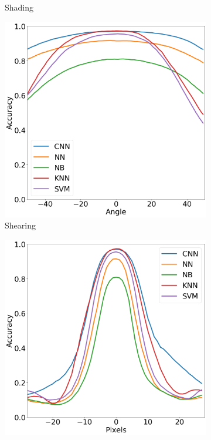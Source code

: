 \begin{figure}[htb!]
\begin{subfigure}[b]{ 0.3\textwidth}
        \caption{Shading}
    \end{subfigure}
    \begin{subfigure}[b]{0.3\textwidth}
        \centering
        \includegraphics[width=\textwidth]{chapters/results/MT/Shear.png}
        \caption{Shearing}
    \end{subfigure}
    \begin{subfigure}[b]{0.3\textwidth}
        \centering
        \includegraphics[width=\textwidth]{chapters/results/MT/ShiftX.png}

\end{subfigure}
\end{figure}
